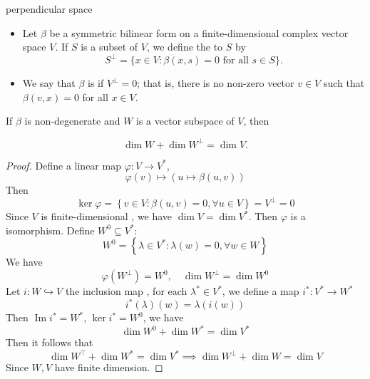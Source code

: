 \documentclass[../main.tex]{subfiles}
\begin{document}
\begin{definition}{perpendicular space}{}
    \begin{itemize}
        \item Let $\beta$ be a symmetric bilinear form on a finite-dimensional complex vector space $V$. If $S$ is a subset of $V$, we define the  to $S$ by
$$S^{\perp} = \{x \in V : \beta(x, s) = 0 \text{ for all } s \in S\}.$$
\item  We say that $\beta$ is  if $V^{\perp} = 0$; that is, there is no non-zero vector $v \in V$ such that $\beta(v, x) = 0$ for all $x \in V$.

    \end{itemize}
    
\end{definition}

\begin{proposition}{}{}
    If $\beta$ is non-degenerate and $W$ is a vector subspace of $V$, then

\[
\dim W + \dim W^{\perp} = \dim V.
\]
\end{proposition}
\begin{proof}
     Define a linear map \(   \varphi :V\to V^{*}  \), \[
      \varphi \left( v \right)\mapsto  \left( u\mapsto \beta \left( u,v \right)  \right)  
     \] Then \[
     \operatorname{ker} \varphi = \left\{ v\in V: \beta \left( u,v \right)= 0 ,\forall u \in V  \right\}= V^{\perp}= 0
     \]Since \(  V  \) is finite-dimensional , we have \(  \operatorname{dim}V= \operatorname{dim}V^{*}  \). Then \(   \varphi   \) is a isomorphism.   Define \(  W^{0}\subseteq V^{*}  \): \[
     W^{0}= \left\{  \lambda \in V^{*}:  \lambda \left( w \right)= 0, \forall w \in W  \right\}
     \]  We have \[
      \varphi \left( W^{\perp} \right)=  W^{0} ,\quad \operatorname{dim}W^{\perp}= \operatorname{dim}W^{0}
     \] Let \(  i: W\hookrightarrow V  \) the inclusion map , for each \(   \lambda ^{*}\in V^{*}  \),  we define a map \(  i ^{*}: V ^{*}\to W^{*}   \) \[
     i ^{*} \left(  \lambda  \right)\left( w \right)=   \lambda \left( i\left( w \right)  \right) 
     \]   Then \(  \operatorname{Im} i ^{*}= W^{*}  \), \(  \operatorname{ker} i ^{*}= W^{0}  \), we have \[
     \operatorname{dim}W^{0}+ \operatorname{dim}W^{*}= \operatorname{dim}V^{*}
     \]  Then it follows that \[
     \operatorname{dim}W^{\top}+ \operatorname{dim}W^{*}= \operatorname{dim}V^{*}\implies  \operatorname{dim}W^{\perp}+ \operatorname{dim}W = \operatorname{dim}V
     \]Since \(  W,V  \) have finite dimension. 
\end{proof}
\end{document}
